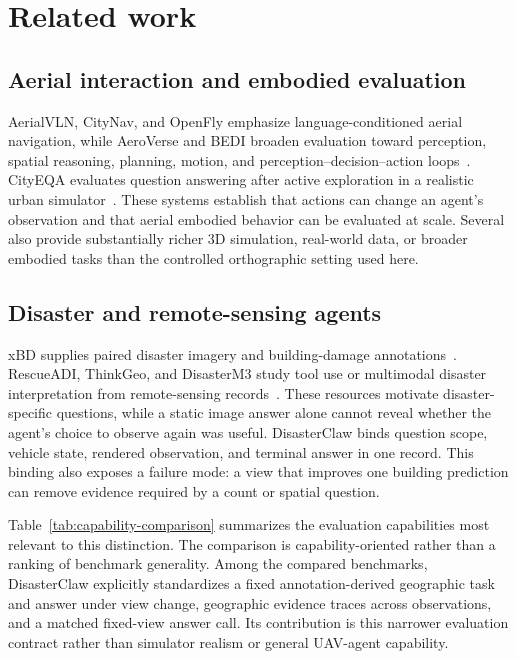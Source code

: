 \section{Related work}
\subsection{Aerial interaction and embodied evaluation}
AerialVLN, CityNav, and OpenFly emphasize language-conditioned aerial navigation, while AeroVerse and BEDI broaden evaluation toward perception, spatial reasoning, planning, motion, and perception--decision--action loops~\cite{liu2023aerialvln,lee2025citynav,gao2026openfly,yao2024aeroverse,guo2026bedi}. CityEQA evaluates question answering after active exploration in a realistic urban simulator~\cite{zhao2025cityeqa}. These systems establish that actions can change an agent's observation and that aerial embodied behavior can be evaluated at scale. Several also provide substantially richer 3D simulation, real-world data, or broader embodied tasks than the controlled orthographic setting used here.

\subsection{Disaster and remote-sensing agents}
xBD supplies paired disaster imagery and building-damage annotations~\cite{gupta2019xbd}. RescueADI, ThinkGeo, and DisasterM3 study tool use or multimodal disaster interpretation from remote-sensing records~\cite{liu2024rescueadi,thinkgeo2025,wang2025disasterm3}. These resources motivate disaster-specific questions, while a static image answer alone cannot reveal whether the agent's choice to observe again was useful. DisasterClaw binds question scope, vehicle state, rendered observation, and terminal answer in one record. This binding also exposes a failure mode: a view that improves one building prediction can remove evidence required by a count or spatial question.

Table~\ref{tab:capability-comparison} summarizes the evaluation capabilities most relevant to this distinction. The comparison is capability-oriented rather than a ranking of benchmark generality. Among the compared benchmarks, DisasterClaw explicitly standardizes a fixed annotation-derived geographic task and answer under view change, geographic evidence traces across observations, and a matched fixed-view answer call. Its contribution is this narrower evaluation contract rather than simulator realism or general UAV-agent capability.

